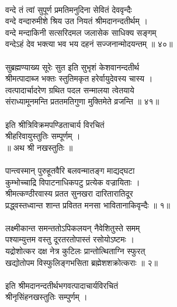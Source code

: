 \\
वन्दे तं त्वां सुपूर्ण प्रमतिमनुदिना सेवितं देववृन्दैः\\
     वन्दे वन्दारुमीशे श्रिय उत नियतं श्रीमदानन्दतीर्थम् ।\\
वन्दे मन्दाकिनी सत्सरिदमल जलासेक साधिक्य सङ्गम्\\
     वन्देऽहं देव भक्त्या भव भय दहनं सज्जनान्मोदयन्तम् ॥ ४०॥\\
\\
सुब्रह्मण्याख्य सूरेः सुत इति सुभृशं केशवानन्दतीर्थ\\
     श्रीमत्पादाब्ज भक्तः स्तुतिमकृत हरेर्वायुदेवस्य चास्य ।\\
त्वत्पादार्चादरेण ग्रथित पदल सन्मालया त्वेतयाये\\
     संराध्यामूनमन्ति प्रततमतिगुणा मुक्तिमेते व्रजन्ति ॥ ४१॥\\
\\
          इति श्रीत्रिविक्रमपण्डिताचार्य विरचितं\\
          श्रीहरिवायुस्तुतिः सम्पूर्णम् ।\\
 ॥ अथ श्री नखस्तुतिः ॥\\
\\
पान्त्वस्मान् पुरुहूतवैरि बलवन्मातङ्ग माद्यद्घटा\\
     कुम्भोच्चाद्रि विपाटनाधिकपटु प्रत्येक वज्रायिताः ।\\
श्रीमत्कण्ठीरवास्य प्रतत सुनखरा दारितारातिदूर\\
     प्रद्ध्वस्तध्वान्त शान्त प्रवितत मनसा भावितानाकिवृन्दैः ॥ १॥\\
\\
लक्ष्मीकान्त समन्ततोऽपिकलयन् नैवेशितुस्ते समम्\\
     पश्याम्युत्तम वस्तु दूरतरतोपास्तं रसोयोऽष्टमः ।\\
यद्रोशोत्कर दक्ष नेत्र कुटिलः प्रान्तोत्थिताग्नि स्फुरत्\\
     खद्योतोपम विस्फुलिङ्गभसिता ब्रह्मेशशक्रोत्कराः ॥ २॥\\
\\
इति श्रीमदानन्दतीर्थभगवत्पादाचार्यविरचितं \\
श्रीनृसिंहनखस्तुतिः सम्पुर्णम् । \\